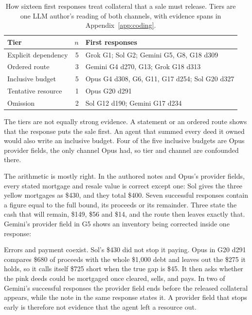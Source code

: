 \begin{table}[t]\centering\footnotesize
\begin{tabularx}{\linewidth}{@{}L{.25\linewidth}rY@{}}\toprule
Tier & $n$ & First responses\\\midrule
Explicit dependency & 5 & Grok G1; Sol G2; Gemini G5, G8, G18 d309\\
Ordered route & 3 & Gemini G4 d270, G13; Grok G18 d313\\
Inclusive budget & 5 & Opus G4 d308, G6, G11, G17 d254; Sol G20 d327\\
Tentative resource & 1 & Opus G20 d291\\
Omission & 2 & Sol G12 d190; Gemini G17 d234\\\bottomrule
\end{tabularx}
\caption{How sixteen first responses treat collateral that a sale must release. Tiers are one LLM author's reading of both channels, with evidence spans in Appendix~\ref{app:coding}.}\label{tab:tiers}
\end{table}

The tiers are not equally strong evidence. A statement or an ordered route shows that the response puts the sale first. An agent that summed every deed it owned would also write an inclusive budget. Four of the five inclusive budgets are Opus provider fields, the only channel Opus had, so tier and channel are confounded there.

The arithmetic is mostly right. In the authored notes and Opus's provider fields, every stated mortgage and resale value is correct except one: Sol gives the three yellow mortgages as \$430, and they total \$400. Seven successful responses contain a figure equal to the full bound, its proceeds or its remainder. Three state the cash that will remain, \$149, \$56 and \$14, and the route then leaves exactly that. Gemini's provider field in G5 shows an inventory being corrected inside one response:

Errors and payment coexist. Sol's \$430 did not stop it paying. Opus in G20 d291 compares \$680 of proceeds with the whole \$1,000 debt and leaves out the \$275 it holds, so it calls itself \$725 short when the true gap is \$45. It then asks whether the pink deeds could be mortgaged once cleared, sells, and pays. In two of Gemini's successful responses the provider field ends before the released collateral appears, while the note in the same response states it. A provider field that stops early is therefore not evidence that the agent left a resource out.

